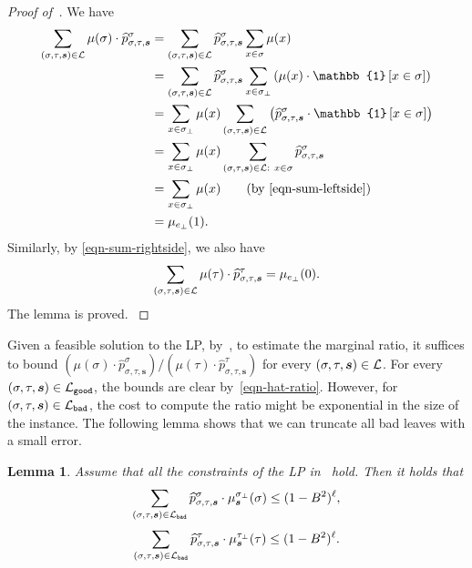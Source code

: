 \documentclass[11pt]{article}
\newtheorem{lemma}[theorem]{Lemma}
\newcommand{\id}[1]{\mathbb{1}\left[#1\right]}
\def\!#1{\mathtt{#1}}
\newcommand{\wh}[1]{\widehat{#1}}
\newcommand{\seqS}{\boldsymbol{s}}
\newcommand{\qgl}[1]{{\color{purple}{#1}}}
\newcommand{\hktodo}[1]{{\color{blue}{#1}}}
\begin{document}
\begin{proof}[Proof of~]
    {
   We have
    \begin{align*}
        \sum_{(\sigma, \tau, \seqS) \in \mathcal L} \mu(\sigma)\cdot \widehat{p}_{\sigma, \tau, \seqS}^{\sigma} &= \sum_{(\sigma, \tau, \seqS) \in \mathcal L} \widehat{p}_{\sigma, \tau, \seqS}^{\sigma} \sum_{x \in \sigma} \mu(x) \\
        &= \sum_{(\sigma, \tau, \seqS) \in \mathcal L} \widehat{p}_{\sigma, \tau, \seqS}^{\sigma} \sum_{x \in \sigma_\bot} \left(\mu(x) \cdot  \id{x \in \sigma}\right) \\
        &= \sum_{x \in \sigma_\bot} \mu(x) \sum_{(\sigma, \tau, \seqS) \in \mathcal L} \left(\widehat{p}_{\sigma, \tau, \seqS}^{\sigma} \cdot \id{x \in \sigma}\right) \\
        &= \sum_{x \in \sigma_\bot} \mu(x) \sum_{(\sigma, \tau, \seqS) \in \+L : \ x \in \sigma} \widehat{p}_{\sigma, \tau, \seqS}^{\sigma} \\
        &= \sum_{x \in \sigma_\bot} \mu(x) \tag{by~\eqref{eqn-sum-leftside}} \\
        &= \mu_{e_\bot}(1).
    \end{align*}
    Similarly, by \eqref{eqn-sum-rightside}, we also have 
    \begin{align*}
    \sum_{(\sigma, \tau, \seqS) \in \+L}\mu(\tau)\cdot\widehat{p}_{\sigma, \tau, \seqS}^{\tau} = \mu_{e_{\bot}}(0).
    \end{align*}
    The lemma is proved.
    }
\end{proof}





Given a feasible solution to the LP, by~, to estimate the marginal ratio, it suffices to bound $\left(\mu(\sigma)\cdot \wh{p}_{\sigma, \tau, \seqS}^{\sigma}\right)/\left(\mu(\tau)\cdot\wh{p}_{\sigma, \tau, \seqS}^{\tau}\right)$ for every $(\sigma, \tau, \seqS) \in \+L$. For every $(\sigma, \tau, \seqS) \in \+L_{\!{good}}$, the bounds are clear by~\eqref{eqn-hat-ratio}. However, for $(\sigma, \tau, \seqS) \in \+L_{\!{bad}}$, the cost to compute the ratio might be exponential in the size of the instance. The following lemma shows that we can truncate all bad leaves with a small error.

\hktodo{the proof}\qgl{ have checked}

\begin{lemma} \label{lem:LP-truncated-error}
     Assume that all the constraints of the LP in~ hold. Then it holds that
    \begin{align}\label{eqn-error1}
        \sum_{(\sigma,\tau, \seqS)\in \+L_{\!{bad}}} \widehat{p}_{\sigma,\tau, \seqS}^{\sigma}\cdot \mu^{\sigma_{\bot}}_{\seqS}(\sigma)\leq (1 - B^2)^{\ell},
    \end{align}
    \begin{align}\label{eqn-error2}
        \sum_{(\sigma,\tau, \seqS)\in \+L_{\!{bad}}}\widehat{p}_{\sigma,\tau, \seqS}^{\tau}\cdot \mu^{\tau_{\bot}}_{\seqS}(\tau)\leq (1- B^2)^{\ell}.
    \end{align}
\end{lemma}
\end{document}

